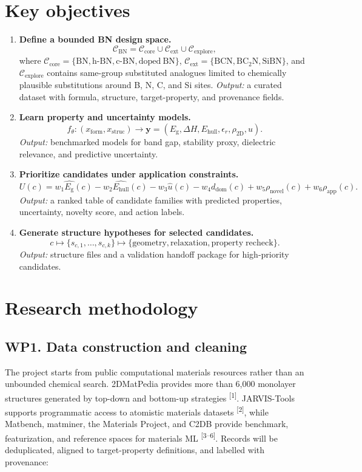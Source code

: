 \documentclass[10pt]{article}
\newcommand{\eg}{E_{\mathrm{g}}}
\newcommand{\ehull}{E_{\mathrm{hull}}}
\newcommand{\form}{x_{\mathrm{form}}}
\newcommand{\struc}{x_{\mathrm{struc}}}
\newcommand{\unc}{u}
\newcommand{\domain}{d_{\mathrm{dom}}}
\newcommand{\utility}{U}
\begin{document}
\section*{Key objectives}
\begin{enumerate}
  \item \textbf{Define a bounded BN design space.}
  \[
    \mathcal{C}_{\mathrm{BN}}=
    \mathcal{C}_{\mathrm{core}}\cup\mathcal{C}_{\mathrm{ext}}\cup
    \mathcal{C}_{\mathrm{explore}},
  \]
  where $\mathcal{C}_{\mathrm{core}}=\{\mathrm{BN},\mathrm{h\mbox{-}BN},
  \mathrm{c\mbox{-}BN},\mathrm{doped\ BN}\}$,
  $\mathcal{C}_{\mathrm{ext}}=\{\mathrm{BCN},\mathrm{BC_2N},\mathrm{SiBN}\}$,
  and $\mathcal{C}_{\mathrm{explore}}$ contains same-group substituted analogues
  limited to chemically plausible substitutions around B, N, C, and Si sites.
  \textit{Output:} a curated dataset with formula, structure, target-property,
  and provenance fields.

  \item \textbf{Learn property and uncertainty models.}
  \[
    f_{\theta}:(\form,\struc)\rightarrow
    \mathbf{y}=(\eg,\Delta H,\ehull,\epsilon_r,\rho_{\mathrm{2D}},\unc).
  \]
  \textit{Output:} benchmarked models for band gap, stability proxy, dielectric
  relevance, and predictive uncertainty.

  \item \textbf{Prioritize candidates under application constraints.}
  \[
    \utility(c)=w_1\hat{\eg}(c)-w_2\hat{\ehull}(c)-w_3\hat{\unc}(c)
    -w_4\domain(c)+w_5\rho_{\mathrm{novel}}(c)+w_6\rho_{\mathrm{app}}(c).
  \]
  \textit{Output:} a ranked table of candidate families with predicted
  properties, uncertainty, novelty score, and action labels.

  \item \textbf{Generate structure hypotheses for selected candidates.}
  \[
    c \mapsto \{s_{c,1},\ldots,s_{c,k}\}
    \mapsto \{\mathrm{geometry},\mathrm{relaxation},\mathrm{property\;recheck}\}.
  \]
  \textit{Output:} structure files and a validation handoff package for
  high-priority candidates.
\end{enumerate}

\section*{Research methodology}
\subsection*{WP1. Data construction and cleaning}
The project starts from public computational materials resources rather than an unbounded chemical search. 2DMatPedia provides more than 6,000 monolayer structures generated by top-down and bottom-up strategies \textsuperscript{[1]}. JARVIS-Tools supports programmatic access to atomistic materials datasets \textsuperscript{[2]}, while Matbench, matminer, the Materials Project, and C2DB provide benchmark, featurization, and reference spaces for materials ML \textsuperscript{[3--6]}. Records will be deduplicated, aligned to target-property definitions, and labelled with provenance:
\end{document}
